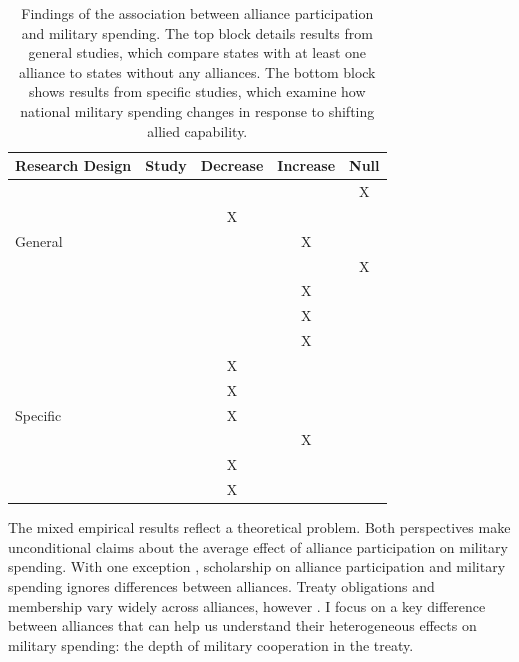 \documentclass[12pt]{article}
\begin{document}
\begin{table}[hbt!]
\begin{center}
\begin{tabular}{lcccc}
   Research Design  & Study & Decrease & Increase & Null \\
\hline
\multirow{5}{*}{General} & \citet{MostSiverson1987} &  &  & X \\
 & \citet{Conybeare1994}    & X & &  \\
 & \citet{Diehl1994}        &  & X &  \\
 & \citet{Goldsmith2003}    &  &  & X \\
 & \citet{MorganPalmer2006} &  & X & \\ 
 & \citet{QuirozFlores2011} &  & X &  \\ 
 \hline
 \multirow{7}{*}{Specific} &\citet{ConybeareSandler1990} &   & X &  \\
 &\citet{BarnettLevy1991} & X  &  &  \\
 &\citet{Morrow1993}      & X  &  &  \\
 &\citet{Sorokin1994}     & X  &  &  \\
 &\citet{Chenetal1996}    &  & X &  \\
 &\citet{PluemperNeumayer2015} & X &  &  \\
 &\citet{GeorgeSandler2017} & X &  &  \\
\hline
\end{tabular}
\caption{Findings of the association between alliance participation and military spending. The top block details results from general studies, which compare states with at least one alliance to states without any alliances. The bottom block shows results from specific studies, which examine how national military spending changes in response to shifting allied capability.}
\label{tab:results-sum}
\end{center} 
\end{table}


The mixed empirical results reflect a theoretical problem. 
Both perspectives make unconditional claims about the average effect of alliance participation on military spending.  
With one exception \citep{DigiuseppePoast2016}, scholarship on alliance participation and military spending ignores differences between alliances.
Treaty obligations and membership vary widely across alliances, however \citep{Leedsetal2002}. 
I focus on a key difference between alliances that can help us understand their heterogeneous effects on military spending: the depth of military cooperation in the treaty.
\end{document}
